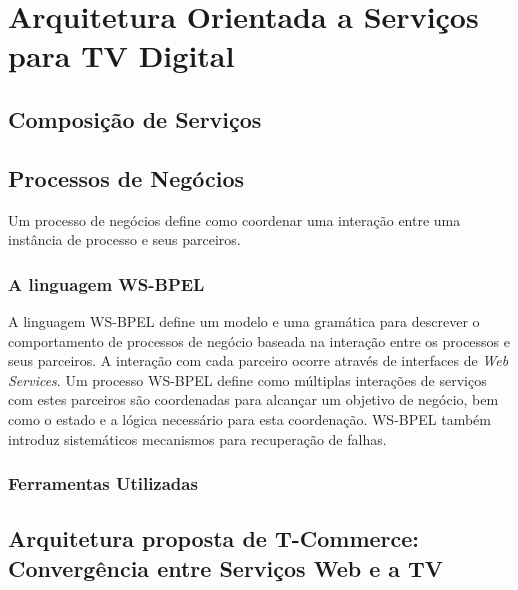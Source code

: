 \section{Arquitetura Orientada a Serviços para TV Digital}
\subsection{Composição de Serviços}
\subsection{Processos de Negócios}

Um processo de negócios define como coordenar uma interação
entre uma instância de processo e seus parceiros. \cite{oasis-wsbpel}

\subsubsection{A linguagem WS-BPEL}

A linguagem WS-BPEL define um modelo e uma gramática para descrever o comportamento
de processos de negócio baseada na interação entre os processos e seus parceiros. 
A interação com cada parceiro ocorre através de interfaces de \textit{Web Services}. 
Um processo WS-BPEL define como múltiplas interações de serviços com estes parceiros
são coordenadas para alcançar um objetivo de negócio, bem como o estado e a lógica necessário 
para esta coordenação. WS-BPEL também introduz sistemáticos mecanismos para recuperação
de falhas. \cite{oasis-wsbpel}

\subsubsection{Ferramentas Utilizadas}
\subsection{Arquitetura proposta de T-Commerce: Convergência entre Serviços Web e a TV}

